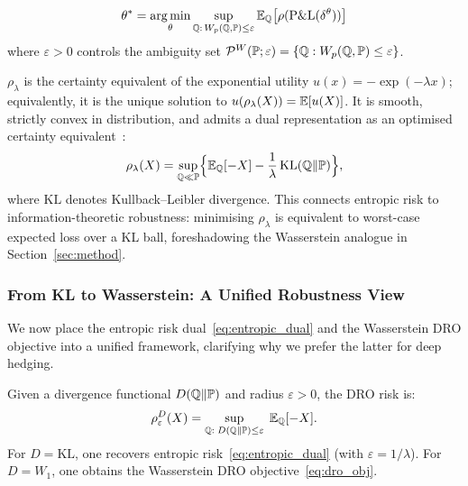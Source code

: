 \begin{definition}
\begin{equation}
    \theta^* = \operatorname*{arg\,min}_\theta \sup_{\mathbb{Q}:\, W_p(\mathbb{Q}, \mathbb{P}) \leq \varepsilon} \mathbb{E}_{\mathbb{Q}}\bigl[\rho(\mathrm{P\&L}(\delta^\theta))\bigr]
\end{equation}
where $\varepsilon > 0$ controls the ambiguity set $\mathcal{P}^W(\mathbb{P}; \varepsilon) = \{\mathbb{Q} : W_p(\mathbb{Q}, \mathbb{P}) \leq \varepsilon\}$.
\end{definition}
\begin{remark}
$\rho_\lambda$ is the certainty equivalent of the exponential utility $u(x)=-\exp(-\lambda x)$; equivalently, it is the unique solution to $u(\rho_\lambda(X))=\mathbb{E}[u(X)]$.  It is smooth, strictly convex in distribution, and admits a dual representation as an optimised certainty equivalent~\citep{follmer2002convex}:
\begin{equation}
    \rho_\lambda(X) = \sup_{\mathbb{Q} \ll \mathbb{P}}\Bigl\{\mathbb{E}_{\mathbb{Q}}[-X] - \frac{1}{\lambda}\,\mathrm{KL}(\mathbb{Q}\|\mathbb{P})\Bigr\},
    \label{eq:entropic_dual}
\end{equation}
where $\mathrm{KL}$ denotes Kullback--Leibler divergence.  This connects entropic risk to information-theoretic robustness: minimising $\rho_\lambda$ is equivalent to worst-case expected loss over a KL ball, foreshadowing the Wasserstein analogue in Section~\ref{sec:method}.
\end{remark}


\subsubsection{From KL to Wasserstein: A Unified Robustness View}

We now place the entropic risk dual~\eqref{eq:entropic_dual} and the Wasserstein DRO objective into a unified framework, clarifying why we prefer the latter for deep hedging.

\begin{definition}
\label{def:gen_dro}
Given a divergence functional $D(\mathbb{Q}\|\mathbb{P})$ and radius $\varepsilon > 0$, the DRO risk is:
\begin{equation}
    \rho^D_\varepsilon(X) = \sup_{\mathbb{Q}:\;D(\mathbb{Q}\|\mathbb{P})\le\varepsilon}\;\mathbb{E}_{\mathbb{Q}}[-X].
    \label{eq:gen_dro}
\end{equation}
For $D = \mathrm{KL}$, one recovers entropic risk~\eqref{eq:entropic_dual} (with $\varepsilon = 1/\lambda$).  For $D = W_1$, one obtains the Wasserstein DRO objective~\eqref{eq:dro_obj}.
\end{definition}

